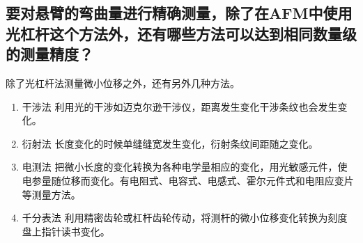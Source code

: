 \documentclass[a4paper]{article}
\begin{document}
\subsection{要对悬臂的弯曲量进行精确测量，除了在AFM中使用光杠杆这个方法外，还有哪些方法可以达到相同数量级的测量精度？}
除了光杠杆法测量微小位移之外，还有另外几种方法。
\begin{enumerate}
\item 干涉法
利用光的干涉如迈克尔逊干涉仪，距离发生变化干涉条纹也会发生变化。
\item 衍射法
长度变化的时候单缝缝宽发生变化，衍射条纹间距随之变化。
\item 电测法
把微小长度的变化转换为各种电学量相应的变化，用光敏感元件，使电参量随位移而变化。有电阻式、电容式、电感式、霍尔元件式和电阻应变片等测量方法。
\item 千分表法
利用精密齿轮或杠杆齿轮传动，将测杆的微小位移变化转换为刻度盘上指针读书变化。
\end{enumerate}

\nocite{jiaocai}

\end{document}
